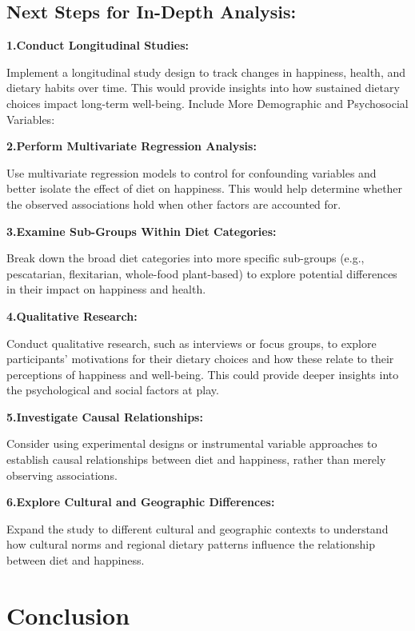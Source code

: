 \documentclass[
]{article}
\begin{document}
\subsection{Next Steps for In-Depth
Analysis:}\label{next-steps-for-in-depth-analysis}

\textbf{1.Conduct Longitudinal Studies:}

Implement a longitudinal study design to track changes in happiness,
health, and dietary habits over time. This would provide insights into
how sustained dietary choices impact long-term well-being. Include More
Demographic and Psychosocial Variables:

\textbf{2.Perform Multivariate Regression Analysis:}

Use multivariate regression models to control for confounding variables
and better isolate the effect of diet on happiness. This would help
determine whether the observed associations hold when other factors are
accounted for.

\textbf{3.Examine Sub-Groups Within Diet Categories:}

Break down the broad diet categories into more specific sub-groups
(e.g., pescatarian, flexitarian, whole-food plant-based) to explore
potential differences in their impact on happiness and health.

\textbf{4.Qualitative Research:}

Conduct qualitative research, such as interviews or focus groups, to
explore participants' motivations for their dietary choices and how
these relate to their perceptions of happiness and well-being. This
could provide deeper insights into the psychological and social factors
at play.

\textbf{5.Investigate Causal Relationships:}

Consider using experimental designs or instrumental variable approaches
to establish causal relationships between diet and happiness, rather
than merely observing associations.

\textbf{6.Explore Cultural and Geographic Differences:}

Expand the study to different cultural and geographic contexts to
understand how cultural norms and regional dietary patterns influence
the relationship between diet and happiness.

\section{Conclusion}\label{conclusion}
\end{document}
